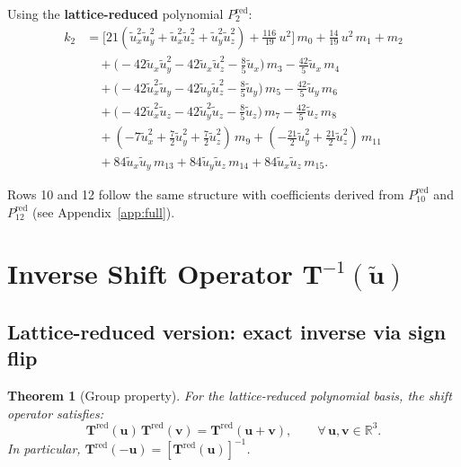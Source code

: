 \documentclass[11pt,a4paper]{article}
\newtheorem{theorem}{Theorem}[section]
\newcommand{\vect}[1]{\bm{#1}}
\newcommand{\mat}[1]{\bm{#1}}
\newcommand{\Tmat}{\mat{T}}
\newcommand{\tu}{\tilde{u}}
\newcommand{\Real}{\mathbb{R}}
\begin{document}
Using the \textbf{lattice-reduced} polynomial $P_2^{\text{red}}$:
\begin{align}
  k_2 &= \bigl[21(\tu_x^2\tu_y^2 + \tu_x^2\tu_z^2 + \tu_y^2\tu_z^2) + \tfrac{116}{19}\,u^2\bigr]\,m_0
       + \tfrac{14}{19}\,u^2\,m_1 + m_2 \nonumber\\
  &\quad + \bigl(-42\tu_x\tu_y^2 - 42\tu_x\tu_z^2 - \tfrac{8}{5}\tu_x\bigr)\,m_3
       - \tfrac{42}{5}\tu_x\,m_4 \nonumber\\
  &\quad + \bigl(-42\tu_x^2\tu_y - 42\tu_y\tu_z^2 - \tfrac{8}{5}\tu_y\bigr)\,m_5
       - \tfrac{42}{5}\tu_y\,m_6 \nonumber\\
  &\quad + \bigl(-42\tu_x^2\tu_z - 42\tu_y^2\tu_z - \tfrac{8}{5}\tu_z\bigr)\,m_7
       - \tfrac{42}{5}\tu_z\,m_8 \nonumber\\
  &\quad + (-7\tu_x^2 + \tfrac{7}{2}\tu_y^2 + \tfrac{7}{2}\tu_z^2)\,m_9
       + (-\tfrac{21}{2}\tu_y^2 + \tfrac{21}{2}\tu_z^2)\,m_{11} \nonumber\\
  &\quad + 84\tu_x\tu_y\,m_{13} + 84\tu_y\tu_z\,m_{14} + 84\tu_x\tu_z\,m_{15}. \label{eq:k2}
\end{align}

Rows 10 and 12 follow the same structure with coefficients derived from $P_{10}^{\text{red}}$ and $P_{12}^{\text{red}}$ (see Appendix~\ref{app:full}).

\section{Inverse Shift Operator \texorpdfstring{$\Tmat^{-1}(\tilde{\vect{u}})$}{T inverse}}\label{sec:inverse}

\subsection{Lattice-reduced version: exact inverse via sign flip}

\begin{theorem}[Group property]\label{thm:group}
For the lattice-reduced polynomial basis, the shift operator satisfies:
\begin{equation}\label{eq:group}
  \Tmat^{\text{red}}(\vect{u})\,\Tmat^{\text{red}}(\vect{v}) = \Tmat^{\text{red}}(\vect{u}+\vect{v}), \qquad \forall\,\vect{u},\vect{v} \in \Real^3.
\end{equation}
In particular, $\Tmat^{\text{red}}(-\vect{u}) = [\Tmat^{\text{red}}(\vect{u})]^{-1}$.
\end{theorem}
\end{document}
